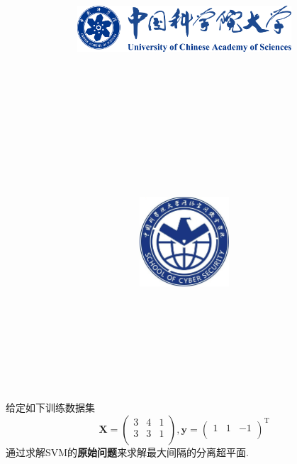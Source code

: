 \documentclass{article}
\title{
	\includegraphics[width=0.6\textwidth]{images/title/ucas_logo 1.pdf}\\
    \vspace{1in}
    \textmd{\textbf{\hmwkClass}}\\
	\textmd{\Large{\textbf{\hmwkClassID}}}\\
    \textmd{\textbf{\hmwkTitle}}\\
    \normalsize\vspace{0.1in}\large{\hmwkCompleteTime }\\
    \vspace{0.1in}\large{\textit{\hmwkClassInstructor\ }}\\
    \vspace{1in}
	\includegraphics[width=0.25\textwidth]{images/title/Cyber.jpg}\\
	\vspace{1in}
}
\author{
	\hmwkAuthorName \\ 
	\hmwkAuthorStuID \\
	\hmwkAuthorInst \\
	\hmwkAuthorzhuanye \\
	\hmwkAuthorfangxiang
	}
\date{}
\begin{document}
\maketitle


%
%
%
%
%




\begin{homeworkProblem}
	给定如下训练数据集$$\boldsymbol{X}=\left( \begin{matrix}
		3&		4&		1\\
		3&		3&		1\\
	\end{matrix} \right) ,\boldsymbol{y}=\left( \begin{matrix}
		1&		1&		-1\\
	\end{matrix} \right) ^{\text{T}}$$
	通过求解SVM的\textbf{原始问题}来求解最大间隔的分离超平面.
	\\


\end{homeworkProblem}
\end{document}
